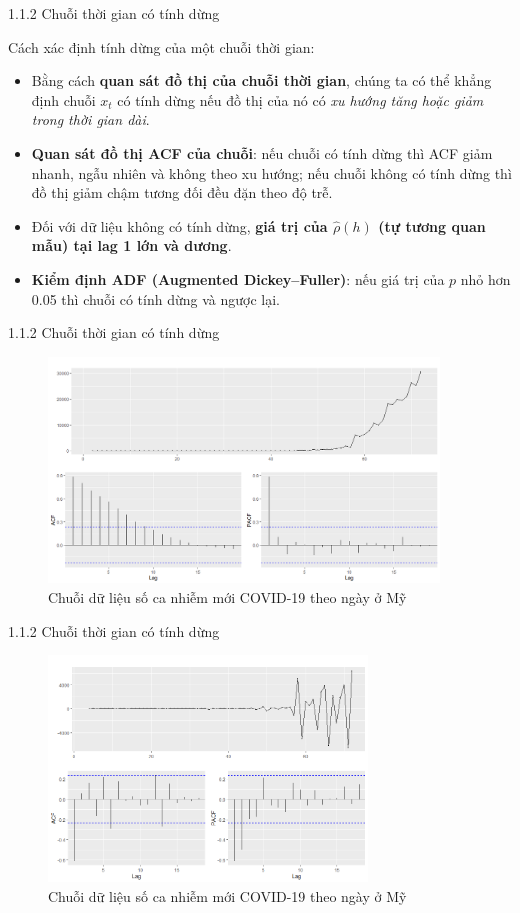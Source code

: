 \documentclass[notheorems,envcountsect,hyperref=unicode]{beamer}
\begin{document}
\begin{frame}{1.1.2 Chuỗi thời gian có tính dừng}
\begin{block}{Cách xác định tính dừng của một chuỗi thời gian:}
\begin{itemize}
	\item Bằng cách \textbf{quan sát đồ thị của chuỗi thời gian}, chúng ta có thể khẳng định chuỗi $x_t$ có tính dừng nếu đồ thị của nó có \textit{xu hướng tăng hoặc giảm trong thời gian dài}.
	\item \textbf{Quan sát đồ thị ACF của chuỗi}: nếu chuỗi có tính dừng thì ACF giảm nhanh, ngẫu nhiên và không theo xu hướng; nếu chuỗi không có tính dừng thì đồ thị giảm chậm tương đối đều đặn theo độ trễ.
	\item Đối với dữ liệu không có tính dừng, \textbf{giá trị của $\hat{\rho}(h)$ (tự tương quan mẫu) tại lag 1 lớn và dương}.
	\item \textbf{Kiểm định ADF (Augmented Dickey–Fuller)}: nếu giá trị của $p$ nhỏ hơn 0.05 thì chuỗi có tính dừng và ngược lại.
\end{itemize}
\end{block}
\end{frame}

\begin{frame}{1.1.2 Chuỗi thời gian có tính dừng}
\begin{figure}[!h]
	\centering
	\includegraphics[width=1\linewidth,height=6cm]{U1}  
	\vskip-4mm
	\caption{Chuỗi dữ liệu số ca nhiễm mới COVID-19 theo ngày ở Mỹ}
	\label{h1}
\end{figure}
\end{frame}

\begin{frame}{1.1.2 Chuỗi thời gian có tính dừng}
	\begin{figure}[!h]
		\centering
		\includegraphics[width=1\linewidth,height=6cm]{U21}  
		\vskip-4mm
		\caption{Chuỗi dữ liệu số ca nhiễm mới COVID-19 theo ngày ở Mỹ}
		\label{h2}
	\end{figure}
\end{frame}
\end{document}
